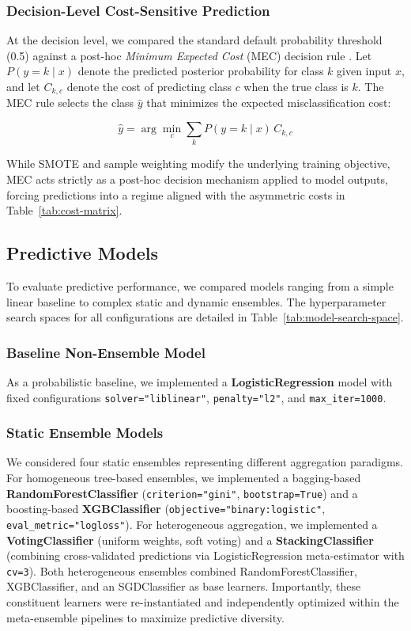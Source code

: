 \documentclass[conference]{IEEEtran}
\begin{document}
\subsubsection{Decision-Level Cost-Sensitive Prediction}

At the decision level, we compared the standard default probability threshold (0.5) against a post-hoc \textit{Minimum Expected Cost} (MEC) decision rule \cite{elkan2001}. Let \(P(y=k \mid x)\) denote the predicted posterior probability for class \(k\) given input \(x\), and let \(C_{k,c}\) denote the cost of predicting class \(c\) when the true class is \(k\). The MEC rule selects the class \(\hat{y}\) that minimizes the expected misclassification cost: 

\begin{equation}
\hat{y} = \arg\min_{c} \sum_{k} P(y=k \mid x)\, C_{k,c}
\end{equation}

While SMOTE and sample weighting modify the underlying training objective, MEC acts strictly as a post-hoc decision mechanism applied to model outputs, forcing predictions into a regime aligned with the asymmetric costs in Table~\ref{tab:cost-matrix}.

\subsection{Predictive Models}
To evaluate predictive performance, we compared models ranging from a simple linear baseline to complex static and dynamic ensembles. The hyperparameter search spaces for all configurations are detailed in Table~\ref{tab:model-search-space}.

\subsubsection{Baseline Non-Ensemble Model}

As a probabilistic baseline, we implemented a \textbf{LogisticRegression} model with fixed configurations \texttt{solver="liblinear"}, \texttt{penalty="l2"}, and \texttt{max\_iter=1000}.

\subsubsection{Static Ensemble Models}
We considered four static ensembles representing different aggregation paradigms. For homogeneous tree-based ensembles, we implemented a bagging-based \textbf{RandomForestClassifier} (\texttt{criterion="gini"}, \texttt{bootstrap=True}) and a boosting-based \textbf{XGBClassifier} (\texttt{objective="binary:logistic"}, \texttt{eval\_metric="logloss"}). For heterogeneous aggregation, we implemented a \textbf{VotingClassifier} (uniform weights, soft voting) and a \textbf{StackingClassifier} (combining cross-validated predictions via LogisticRegression meta-estimator with \texttt{cv=3}). Both heterogeneous ensembles combined RandomForestClassifier, XGBClassifier, and an SGDClassifier as base learners. Importantly, these constituent learners were re-instantiated and independently optimized within the meta-ensemble pipelines to maximize predictive diversity.
\end{document}
